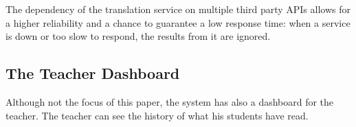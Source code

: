 The dependency of the translation service on multiple third party APIs allows for a higher reliability and a chance to guarantee a low response time: when a service is down or too slow to respond, the results from it are ignored.

\subsection{The Teacher Dashboard}

Although not the focus of this paper, the system has also a dashboard for the teacher. The teacher can see the history of what his students have read. 






